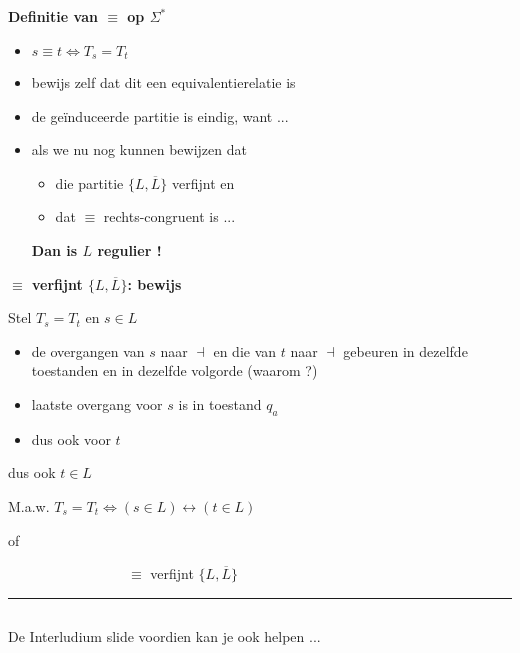 \documentclass{seminar}
\newcommand{\eindm}{\dashv }
\newcommand{\prend}{\hfill \rule{2.3mm}{2.3mm} \hspace*{3mm} $ $}
\begin{document}
\begin{slide}
{\bf Definitie van $\equiv$ op $\Sigma^*$}

\begin{itemize}
\item 
$s \equiv t \Leftrightarrow T_s = T_t$

\item 
bewijs zelf dat dit een equivalentierelatie is

\item 
de ge\"{i}nduceerde partitie is eindig, want ...

\item
als we nu nog kunnen bewijzen dat 
\begin{itemize}
\item

die partitie $\{L, \overline{L}\}$
verfijnt en 

\item
dat $\equiv$ rechts-congruent is ...
\end{itemize}

{\bf Dan is $L$ regulier !}
\end{itemize}


\end{slide} 

\begin{slide}

{\bf $\equiv$ verfijnt $\{L, \overline{L}\}$: bewijs}

Stel $T_s = T_t$ en $s \in L$

\begin{itemize}
\item 
de overgangen van $s$ naar $\eindm$ en die van $t$ naar $\eindm$
gebeuren in dezelfde toestanden en in dezelfde volgorde (waarom ?)

\item 
laatste overgang voor $s$ is in toestand $q_a$

\item
dus ook voor $t$

\end{itemize}

dus ook $t \in L$

M.a.w. $T_s = T_t \Leftrightarrow (s \in L) \leftrightarrow (t \in L)$

of

~~~~~~~~~~~~~~~~~$\equiv$ verfijnt $\{L, \overline{L}\}$

\prend

De Interludium slide voordien kan je ook helpen ...
\end{slide} 
\end{document}
